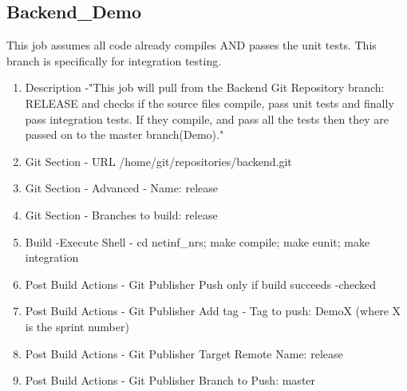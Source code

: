 \subsection{Backend\_Demo}

This job assumes all code already compiles AND passes the unit tests. This branch is specifically for integration testing.

\begin{enumerate}
\item Description -"This job will pull from the Backend Git Repository branch: RELEASE and checks if the source files compile, pass unit tests and finally pass integration tests. If they compile, and pass all the tests then they are passed on to the master branch(Demo)."
\item Git Section - URL /home/git/repositories/backend.git
\item Git Section - Advanced - Name: release
\item Git Section - Branches to build: release
\item Build -Execute Shell - cd netinf\_nrs; make compile; make eunit; make integration
\item Post Build Actions - Git Publisher Push only if build succeeds -checked
\item Post Build Actions - Git Publisher Add tag - Tag to push: DemoX (where X is the sprint number)
\item Post Build Actions - Git Publisher Target Remote Name: release
\item Post Build Actions - Git Publisher Branch to Push: master
\end{enumerate}
